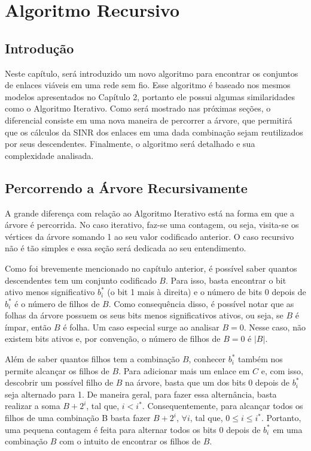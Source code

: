 \chapter{Algoritmo Recursivo}
\label{cap:recursivo}

\section{Introdução}

Neste capítulo, será introduzido um novo algoritmo para encontrar os conjuntos de enlaces viáveis em uma rede sem fio. Esse algoritmo é baseado nos mesmos modelos apresentados no Capítulo 2, portanto ele possui algumas similaridades como o Algoritmo Iterativo. Como será mostrado nas próximas seções, o diferencial consiste em uma nova maneira de percorrer a árvore, que permitirá que os cálculos da SINR dos enlaces em uma dada combinação sejam reutilizados por seus descendentes. Finalmente, o algoritmo será detalhado e sua complexidade analisada.

\section{Percorrendo a Árvore Recursivamente}

A grande diferença com relação ao Algoritmo Iterativo está na forma em que a árvore é percorrida. No caso iterativo, faz-se uma contagem, ou seja, visita-se os vértices da árvore somando 1 ao seu valor codificado anterior. O caso recursivo não é tão simples e essa seção será dedicada ao seu entendimento.

Como foi brevemente mencionado no capítulo anterior, é possível saber quantos descendentes tem um conjunto codificado $B$. Para isso, basta encontrar o bit ativo menos significativo $b_i^*$ (o bit 1 mais à direita) e o número de bits 0 depois de $b_i^*$ é o número de filhos de $B$. Como consequência disso, é possível notar que as folhas da árvore possuem os seus bits menos significativos ativos, ou seja, se $B$ é ímpar, então $B$ é folha. Um caso especial surge ao analisar $B=0$. Nesse caso, não existem bits ativos e, por convenção, o número de filhos de $B=0$ é $|B|$.

Além de saber quantos filhos tem a combinação $B$, conhecer $b_i^*$ também nos permite alcançar os filhos de $B$. Para adicionar mais um enlace em $C$ e, com isso, descobrir um possível filho de $B$ na árvore, basta que um dos bits 0 depois de $b_i^*$ seja alternado para 1. De maneira geral, para fazer essa alternância, basta realizar a soma $B + 2^i$, tal que, $i < i^*$. Consequentemente, para alcançar todos os filhos de uma combinação B basta fazer $B + 2^i$, $\forall i$, tal que, $0\leq i\leq i^*$. Portanto, uma pequena contagem é feita para alternar todos os bits 0 depois de $b_i^*$ em uma combinação $B$ com o intuito de encontrar os filhos de $B$.

